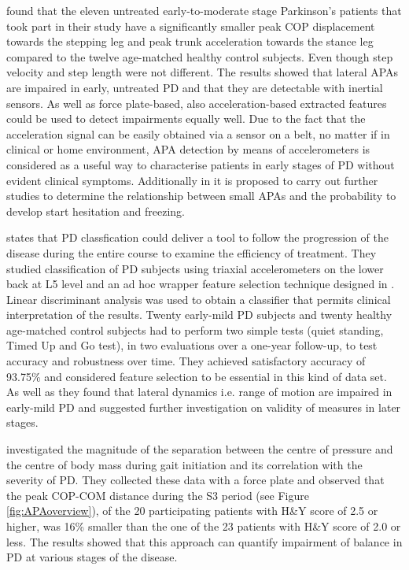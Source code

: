 \citeauthor{mancini_anticipatory_2009} \cite{mancini_anticipatory_2009} found that the eleven untreated early-to-moderate stage Parkinson's patients that took part in their study have a significantly smaller peak COP displacement towards the stepping leg and peak trunk acceleration towards the stance leg compared to the twelve age-matched healthy control subjects. Even though step velocity and step length were not different. The results showed that lateral APAs are impaired in early, untreated PD and that they are detectable with inertial sensors. As well as force plate-based, also acceleration-based extracted features could be used to detect impairments equally well. Due to the fact that the acceleration signal can be easily obtained via a sensor on a belt, no matter if in clinical or home environment, APA detection by means of accelerometers is considered as a useful way to characterise patients in early stages of PD without evident clinical symptoms. Additionally in \cite{mancini_anticipatory_2009} it is proposed to carry out further studies to determine the relationship between small APAs and the probability to develop start hesitation and freezing.

\citeauthor{palmerini_classification_2013} \cite{palmerini_classification_2013} states that PD classfication could deliver a tool to follow the progression of the disease during the entire course to examine the efficiency of treatment. They studied classification of PD subjects  using triaxial accelerometers on the lower back at L5 level and an ad hoc wrapper feature selection technique designed in \cite{palmerini_quantification_2013}. Linear discriminant analysis was used to obtain a classifier that permits clinical interpretation of the results. Twenty early-mild PD subjects and twenty healthy age-matched control subjects had to perform two simple tests (quiet standing, Timed Up and Go test), in two evaluations over a one-year follow-up, to test accuracy and robustness over time. They achieved satisfactory accuracy of 93.75\% and considered feature selection to be essential in this kind of data set. As well as \cite{mancini_anticipatory_2009} they found that lateral dynamics i.e. range of motion are impaired in early-mild PD and suggested further investigation on validity of measures in later stages.

\citeauthor{hass_gait_2005-1} \cite{hass_gait_2005-1} investigated the magnitude of the separation between the centre of pressure and the centre of body mass during gait initiation and its correlation with the severity of PD. They collected these data with a force plate and observed that the peak COP-COM distance during the S3 period (see Figure \ref{fig:APAoverview}), of the 20 participating patients with H\&Y score of 2.5 or higher, was 16\% smaller than the one of the 23 patients with H\&Y score of 2.0 or less. The results showed that this approach can quantify impairment of balance in PD at various stages of the disease.


